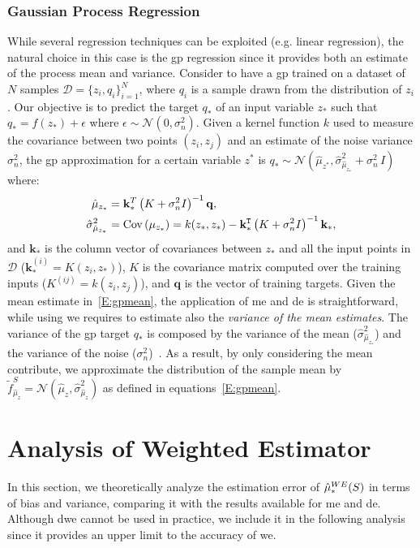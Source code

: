 \subsubsection{Gaussian Process Regression}
While several regression techniques can be exploited (e.g. linear regression), the natural choice in this case is the \gls{gp} regression since it provides both an estimate of the process mean and variance.
Consider to have a \gls{gp} trained on a dataset of $N$ samples $\mathcal{D}=\{z_i, q_i\}_{i=1}^{N}$, where $q_i$ is a sample drawn from the distribution of $z_i$.
Our objective is to predict the target $q_*$ of an input variable $z_*$ such that $q_* = f(z_*) + \epsilon$ where $\epsilon \sim \mathcal{N}(0, \sigma_n^2)$.
Given a kernel function $k$ used to measure the covariance between two points $(z_i,z_j)$ and an estimate of the noise variance $\sigma^2_n$, the \gls{gp} approximation for a certain variable $z^*$ is $q_* \sim \mathcal{N}\left(\hat{\mu}_{z^*}, \hat{\sigma}^2_{\hat{\mu}_{z_*}} + \sigma_n^2\, I \right)$ where:
\begin{align}\label{E:gpmean}
\hat{\mu}_{z_*} &= \mathbf{k}^T_* \left(K + \sigma^2_n I\right)^{-1}\mathbf{q},\\
\nonumber
\hat{\sigma}^2_{\hat{\mu}_{z_*}} &= 
\text{Cov}\left(\mu_{z_*}\right) = k(z_*, z_*) - {\mathbf{k}}^\texttt{T}_* \left( K + \sigma^2_n I \right)^{-1}\mathbf{k}_*,
\end{align}
and $\mathbf{k}_*$ is the column vector of covariances between $z_*$ and all the input points in $\mathcal{D}$ ($\mathbf{k}_*^{(i)} = K(z_i, z_*)$), $K$ is the covariance matrix computed over the training inputs ($K^{(ij)} = k(z_i,z_j)$), and $\mathbf{q}$ is the vector of training targets.
Given the mean estimate in~\ref{E:gpmean}, the application of \gls{me} and \gls{de} is straightforward, while using \gls{we} requires to estimate also the \emph{variance of the mean estimates}.
The variance of the \gls{gp} target $q_*$ is composed by the variance of the mean ($\hat{\sigma}^2_{\hat{\mu}_{z_*}}$) and the variance of the noise ($\sigma^2_n$)~\cite{rasmussen2005gaussian}.
As a result, by only considering the mean contribute, we approximate the distribution of the sample mean by  $\tilde{f}_{\hat{\mu}_z}^S = \mathcal{N}\left(\hat{\mu}_z, \hat{\sigma}^2_{\hat{\mu}_z} \right)$ as defined in equations~\ref{E:gpmean}.

\section{Analysis of Weighted Estimator}
In this section, we theoretically analyze the estimation error of $\hat\mu_*^{WE}(S)$ in terms of bias and variance, comparing it with the results available for \gls{me} and \gls{de}.
Although \gls{dwe} cannot be used in practice, we include it in the following analysis since it provides an upper limit to the accuracy of \gls{we}.

